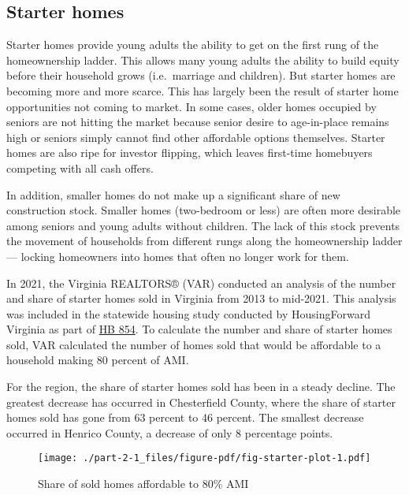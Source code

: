 \documentclass[
  letterpaper,
  DIV=11,
  numbers=noendperiod]{scrreprt}
\begin{document}
\hypertarget{starter-homes}{%
\subsection{Starter homes}\label{starter-homes}}

Starter homes provide young adults the ability to get on the first rung
of the homeownership ladder. This allows many young adults the ability
to build equity before their household grows (i.e.~marriage and
children). But starter homes are becoming more and more scarce. This has
largely been the result of starter home opportunities not coming to
market. In some cases, older homes occupied by seniors are not hitting
the market because senior desire to age-in-place remains high or seniors
simply cannot find other affordable options themselves. Starter homes
are also ripe for investor flipping, which leaves first-time homebuyers
competing with all cash offers.

In addition, smaller homes do not make up a significant share of new
construction stock. Smaller homes (two-bedroom or less) are often more
desirable among seniors and young adults without children. The lack of
this stock prevents the movement of households from different rungs
along the homeownership ladder --- locking homeowners into homes that
often no longer work for them.

In 2021, the Virginia REALTORS® (VAR) conducted an analysis of the
number and share of starter homes sold in Virginia from 2013 to
mid-2021. This analysis was included in the statewide housing study
conducted by HousingForward Virginia as part of
\href{https://dmz1.dhcd.virginia.gov/HB854/part-3-homeownership.html\#finding-2-starter-home-inventory-is-decreasing.}{HB
854}. To calculate the number and share of starter homes sold, VAR
calculated the number of homes sold that would be affordable to a
household making 80 percent of AMI.

For the region, the share of starter homes sold has been in a steady
decline. The greatest decrease has occurred in Chesterfield County,
where the share of starter homes sold has gone from 63 percent to 46
percent. The smallest decrease occurred in Henrico County, a decrease of
only 8 percentage points.

\begin{figure}

{\centering \texttt{[image: ./part-2-1\_files/figure-pdf/fig-starter-plot-1.pdf]}

}

\caption{\label{fig-starter-plot}Share of sold homes affordable to 80\%
AMI}

\end{figure}
\end{document}

